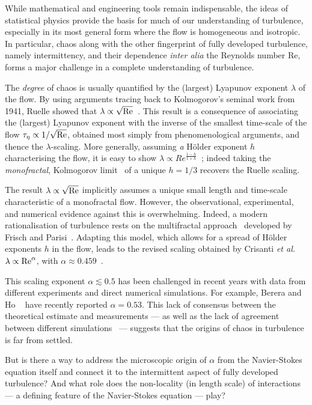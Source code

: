 \documentclass[amsmath,amssymb,amsbsy,pre,twocolumn,tightenlines,superscriptaddress,floatfix]{revtex4-2}
\begin{document}
While mathematical and engineering tools remain indispensable, the ideas of
statistical physics provide the basis for much of our understanding of
turbulence, especially in its most general form where the flow is homogeneous
and isotropic. In particular, chaos along with the other fingerprint of fully
developed turbulence, namely intermittency, and their dependence \textit{inter
alia} the Reynolds number Re, forms a major challenge in a complete
understanding of turbulence.

The \textit{degree} of chaos is usually quantified by the (largest) Lyapunov
exponent $\lambda$ of the flow. By using arguments tracing back to
Kolmogorov's seminal work from 1941, Ruelle showed that
$\lambda \propto \sqrt{{\rm Re}}$~\cite{Ruelle}. This result is a consequence of
associating the (largest) Lyapunov exponent with the inverse of the smallest
time-scale of the flow  $\tau_\eta \propto 1/\sqrt{{\rm Re}}$, obtained most simply from
phenomenological arguments, and thence the $\lambda$-scaling.
More generally, assuming \textit{a} H\"older exponent $h$ characterising the flow,
it is easy to show $\lambda \propto Re^{\frac{1-h}{1+h}}$~\cite{Vulpiani}; indeed taking the \textit{monofractal},
Kolmogorov limit~\cite{K41} of a unique $h = 1/3$ recovers the Ruelle scaling.

The result $\lambda \propto \sqrt{{\rm Re}}$ implicitly assumes a unique small length and
time-scale characteristic of a monofractal flow. However, the observational, experimental,
and numerical evidence against this is overwhelming. Indeed, a modern
rationalisation of turbulence rests on the multifractal approach~\cite{Benzi} developed by
Frisch and Parisi~\cite{Frisch-Parisi}. Adapting this model, which allows for a spread of H\"older
exponents $h$ in the flow, leads to the revised scaling obtained by Crisanti
\textit{et al.} $\lambda \propto {\rm Re}^\alpha$, with $\alpha \approx 0.459$~\cite{Vulpiani}.

This scaling exponent $\alpha \lesssim 0.5$ has been challenged in recent years
with data from different experiments and direct numerical simulations. For
example, Berera and Ho ~\cite{BereraPRL} have recently reported $\alpha =
0.53$. This lack of consensus between the theoretical estimate and measurements
--- as well as the lack of agreement between different
simulations~\cite{Yamada1987,Vulpiani,BereraPRL,Siddhartha,Boffetta_2017,Mohan_higher,Vassilicos_2023}
--- suggests that the origins of chaos in turbulence is far from settled.

But is there a way to address the microscopic origin of $\alpha$ from the
Navier-Stokes equation itself and connect it to the intermittent aspect of
fully developed turbulence?  And what role does the non-locality (in length
scale) of interactions --- a defining feature of the Navier-Stokes equation ---
play?
\end{document}
